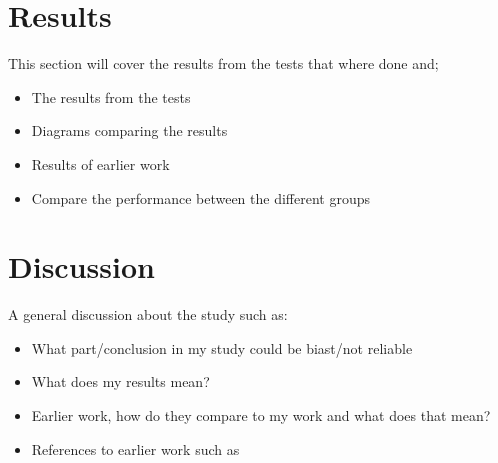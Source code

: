 \documentclass[runningheads,a4paper,oribibl]{llncs}
\begin{document}

\section{Results}
This section will cover the results from the tests that where done and;
\begin{itemize}
	\item The results from the tests
	\item Diagrams comparing the results
	\item Results of earlier work
	\item Compare the performance between the different groups
\end{itemize}












\section{Discussion}
A general discussion about the study such as:
\begin{itemize}
	\item What part/conclusion in my study could be biast/not reliable
	\item What does my results mean?
	\item Earlier work, how do they compare to my work and what does that mean?
	\item References to earlier work such as~\cite{schmierbach2011exploring}
\end{itemize}
\end{document}
